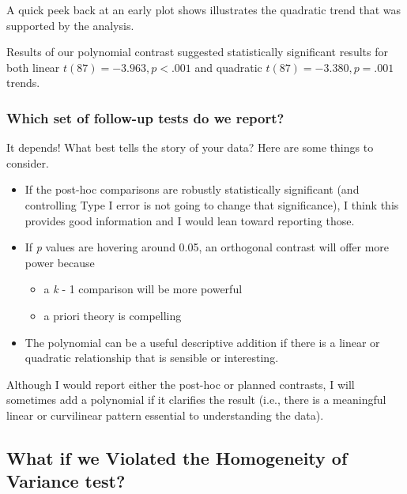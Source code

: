 \documentclass[
  11pt,
]{book}
\providecommand{\tightlist}{%
  \setlength{\itemsep}{0pt}\setlength{\parskip}{0pt}}
\begin{document}
A quick peek back at an early plot shows illustrates the quadratic trend that was supported by the analysis.

Results of our polynomial contrast suggested statistically significant results for both linear \(t(87) = -3.963 , p < .001\) and quadratic \(t(87) = -3.380, p = .001\) trends.

\hypertarget{which-set-of-follow-up-tests-do-we-report}{%
\subsubsection{Which set of follow-up tests do we report?}\label{which-set-of-follow-up-tests-do-we-report}}

It depends! What best tells the story of your data? Here are some things to consider.

\begin{itemize}
\tightlist
\item
  If the post-hoc comparisons are robustly statistically significant (and controlling Type I error is not going to change that significance), I think this provides good information and I would lean toward reporting those.
\item
  If \emph{p} values are hovering around 0.05, an orthogonal contrast will offer more power because

  \begin{itemize}
  \tightlist
  \item
    a \emph{k} - 1 comparison will be more powerful
  \item
    a priori theory is compelling
  \end{itemize}
\item
  The polynomial can be a useful descriptive addition if there is a linear or quadratic relationship that is sensible or interesting.
\end{itemize}

Although I would report either the post-hoc or planned contrasts, I will sometimes add a polynomial if it clarifies the result (i.e., there is a meaningful linear or curvilinear pattern essential to understanding the data).

\hypertarget{what-if-we-violated-the-homogeneity-of-variance-test}{%
\subsection{What if we Violated the Homogeneity of Variance test?}\label{what-if-we-violated-the-homogeneity-of-variance-test}}
\end{document}
